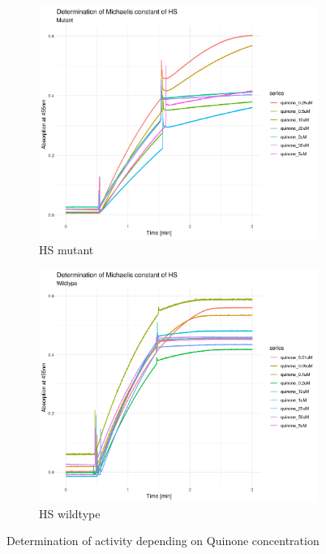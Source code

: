\begin{figure}
    \centering
    \begin{subfigure}{0.75\textwidth}
	\includegraphics[width=\textwidth]{img/activity_mut_quinone.png}
	\caption{HS mutant}
	\label{fig:activity_mut_quinone}
    \end{subfigure}

    \begin{subfigure}{0.75\textwidth}
	\includegraphics[width=\textwidth]{img/activity_wt_quinone.png}
	\caption{HS wildtype}
	\label{fig:activity_wt_quinone}
    \end{subfigure}
    \caption{Determination of activity depending on Quinone concentration}
    \label{fig:activity_quinone}
\end{figure}

